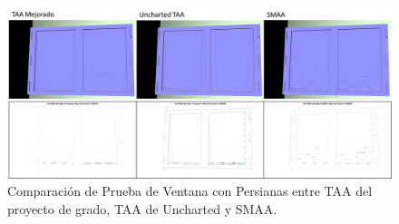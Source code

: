 \documentclass[pregrado]{tesis-usb} %
\begin{document}
\begin{figure}[!htb]
	\centering
	\includegraphics[scale=0.3]{images/results/window_blind.png}
	\caption{Comparación de Prueba de Ventana con Persianas entre TAA del proyecto de grado, TAA de Uncharted y SMAA.}\label{fig:window_blind_render}
\end{figure}

\FloatBarrier
\end{document}
